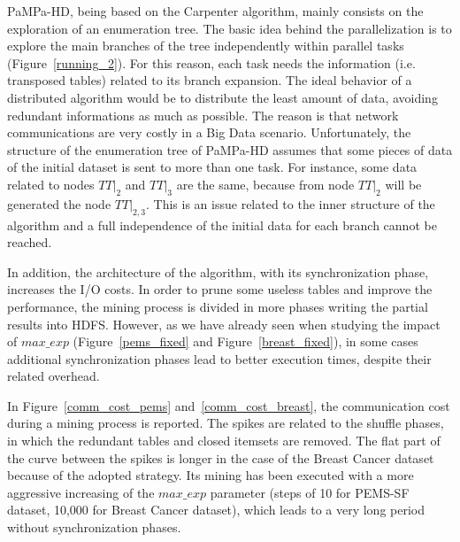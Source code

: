 PaMPa-HD, being based on the Carpenter algorithm, mainly consists on the exploration of an enumeration tree. The basic idea behind the parallelization is to explore the main branches of the tree independently within parallel tasks (Figure~\ref{running_2}). For this reason, each task needs the information (i.e. transposed tables) related to its branch expansion.
The ideal behavior of a distributed algorithm would be to distribute the least amount of data, avoiding redundant informations as much as possible. The reason is that network communications are very costly in a Big Data scenario.
Unfortunately, the structure of the enumeration tree of PaMPa-HD assumes that some pieces of data of the initial dataset is sent to more than one task. For instance, some data related to nodes $TT|_{2}$ and $TT|_{3}$ are the same, because from node $TT|_{2}$ will be generated the node $TT|_{2, 3}$. This is an issue related to the inner structure of the algorithm and a full independence of the initial data for each branch cannot be reached.

In addition, the architecture of the algorithm, with its synchronization phase, increases the I/O costs. In order to prune some useless tables and improve the performance, the mining process is divided in more phases writing the partial results into HDFS.
However, as we have already seen when studying the impact of $max\_exp$ (Figure~\ref{pems_fixed} and Figure~\ref{breast_fixed}), in some cases additional synchronization phases lead to better execution times, despite their related overhead.

In Figure~\ref{comm_cost_pems} and~\ref{comm_cost_breast}, the communication cost during a mining process is reported. The spikes are related to the shuffle phases, in which the redundant tables and closed itemsets are removed.
The flat part of the curve between the spikes is longer in the case of the Breast Cancer dataset because of the adopted strategy. Its mining has been executed with a more aggressive increasing of the $max\_exp$ parameter (steps of 10 for PEMS-SF dataset, 10,000 for Breast Cancer dataset), which leads to a very long period without synchronization phases.


